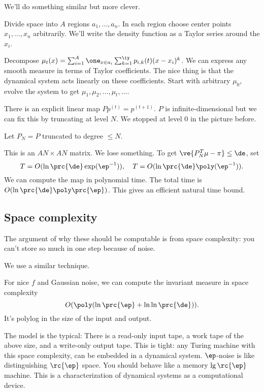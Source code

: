 We'll do something similar but more clever.

Divide space into $A$ regions $a_1,\ldots, a_n$. In each region choose center points $x_1,\ldots, x_n$ arbitrarily. We'll write the density function as a Taylor series around the $x_i$.

Decompose $\mu_t(x) = \sum_{i=1}^A \one_{x\in a_i} \sum_{k=1}^{\iy} p_{i,k}(t) (x-x_i)^k$.  We can express any smooth measure in terms of Taylor coefficients. The nice thing is that the dynamical system acts linearly on these coefficients. Start with arbitrary $\mu_0$, evolve the system to get $\mu_1,\mu_2,\ldots, \mu_t,\ldots$.

There is an explicit linear map $Pp^{(t)}=p^{(t+1)}$. $P$ is infinite-dimensional but we can fix this by truncating at level $N$. We stopped at level 0 in the picture before.

Let $P_N=P$ truncated to degree $\le N$.

This is an $AN\times AN$ matrix.
We lose something. To get $\ve{P_N^T\mu - \pi}\le \de$, set 
\[
T=O(\ln \prc{\de} \exp(\ep^{-1})),\quad T=O(\ln \prc{\de} \poly(\ep^{-1})).
\]
We can compute the map in polynomial time. The total time is $O(\ln \prc{\de}\poly\prc{\ep})$.
This gives an efficient natural time bound. 

\subsection{Space complexity}

The argument of why these should be computable is from space complexity: you can't store so much in one step because of noise.

We use a similar technique. 
\begin{thm}
For nice $f$ and Gaussian noise, we can compute the invariant measure in space complexity 
\[
O(\poly(\ln \prc{\ep} + \ln \ln \prc{\de})).
\]
It's polylog in the size of the input and output.
\end{thm}
The model is the typical: There is a read-only input tape, a work tape of the above size, and a write-only output tape.
This is tight: any Turing machine with this space complexity, can be embedded in a dynamical system.
$\ep$-noise is like distinguishing $\rc{\ep}$ space. You should behave like a memory $\lg\rc{\ep}$ machine. %
This is a characterization of dynamical systems as a computational device.

